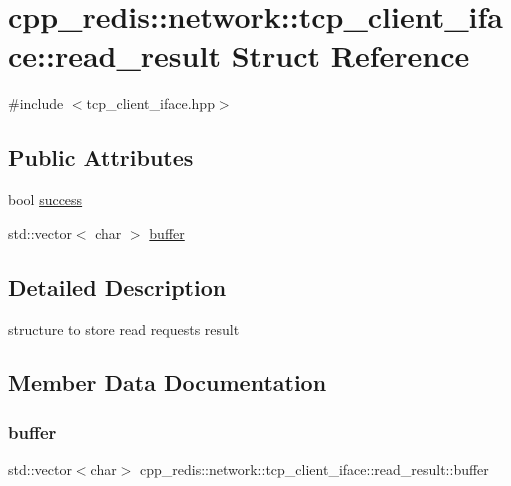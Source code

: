 \hypertarget{structcpp__redis_1_1network_1_1tcp__client__iface_1_1read__result}{}\section{cpp\+\_\+redis\+:\+:network\+:\+:tcp\+\_\+client\+\_\+iface\+:\+:read\+\_\+result Struct Reference}
\label{structcpp__redis_1_1network_1_1tcp__client__iface_1_1read__result}


{\ttfamily \#include $<$tcp\+\_\+client\+\_\+iface.\+hpp$>$}

\subsection*{Public Attributes}
\begin{DoxyCompactItemize}
\item 
bool \mbox{\hyperlink{structcpp__redis_1_1network_1_1tcp__client__iface_1_1read__result_ab9a3a54474c382a00323ed02f4239faa}{success}}
\item 
std\+::vector$<$ char $>$ \mbox{\hyperlink{structcpp__redis_1_1network_1_1tcp__client__iface_1_1read__result_af8275097ebe558e7ce0f2aa29131cb05}{buffer}}
\end{DoxyCompactItemize}


\subsection{Detailed Description}
structure to store read requests result 

\subsection{Member Data Documentation}
\mbox{\label{structcpp__redis_1_1network_1_1tcp__client__iface_1_1read__result_af8275097ebe558e7ce0f2aa29131cb05}} 
\subsubsection{\texorpdfstring{buffer}{buffer}}
{\footnotesize\ttfamily std\+::vector$<$char$>$ cpp\+\_\+redis\+::network\+::tcp\+\_\+client\+\_\+iface\+::read\+\_\+result\+::buffer}

